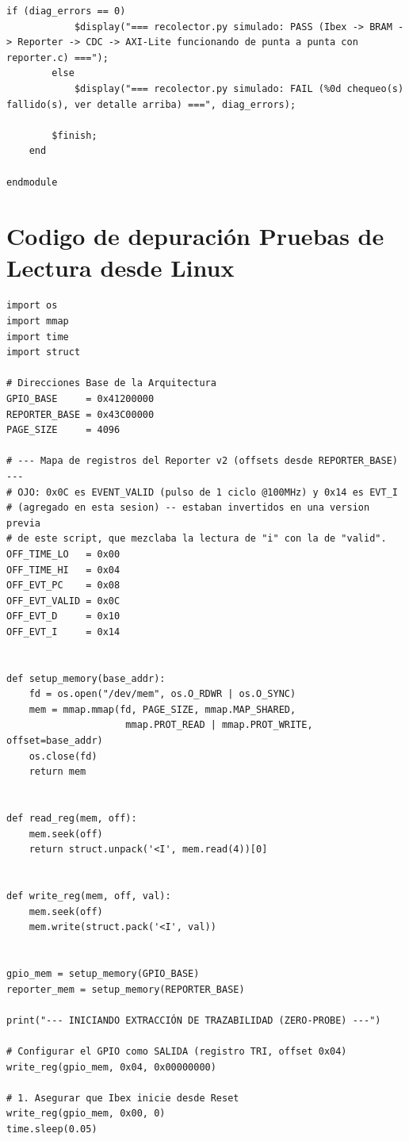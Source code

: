 \begin{lstlisting}[style=verilogstyle, basicstyle=\ttfamily\footnotesize, caption={Código fuente del subsistema \texttt{tb\_ibex\_bram\_subsystem.sv}}, label={code:tb_ibex_bram_subsystem.sv}]
        if (diag_errors == 0)
            $display("=== recolector.py simulado: PASS (Ibex -> BRAM -> Reporter -> CDC -> AXI-Lite funcionando de punta a punta con reporter.c) ===");
        else
            $display("=== recolector.py simulado: FAIL (%0d chequeo(s) fallido(s), ver detalle arriba) ===", diag_errors);

        $finish;
    end

endmodule
\end{lstlisting}


\section{Codigo de depuración Pruebas de Lectura desde Linux}

\begin{lstlisting}[style=pythonstyle, basicstyle=\ttfamily\footnotesize, caption={Código recolector.py}, label={code:recolector.py}]
import os
import mmap
import time
import struct

# Direcciones Base de la Arquitectura
GPIO_BASE     = 0x41200000
REPORTER_BASE = 0x43C00000
PAGE_SIZE     = 4096

# --- Mapa de registros del Reporter v2 (offsets desde REPORTER_BASE) ---
# OJO: 0x0C es EVENT_VALID (pulso de 1 ciclo @100MHz) y 0x14 es EVT_I
# (agregado en esta sesion) -- estaban invertidos en una version previa
# de este script, que mezclaba la lectura de "i" con la de "valid".
OFF_TIME_LO   = 0x00
OFF_TIME_HI   = 0x04
OFF_EVT_PC    = 0x08
OFF_EVT_VALID = 0x0C
OFF_EVT_D     = 0x10
OFF_EVT_I     = 0x14


def setup_memory(base_addr):
    fd = os.open("/dev/mem", os.O_RDWR | os.O_SYNC)
    mem = mmap.mmap(fd, PAGE_SIZE, mmap.MAP_SHARED,
                     mmap.PROT_READ | mmap.PROT_WRITE, offset=base_addr)
    os.close(fd)
    return mem


def read_reg(mem, off):
    mem.seek(off)
    return struct.unpack('<I', mem.read(4))[0]


def write_reg(mem, off, val):
    mem.seek(off)
    mem.write(struct.pack('<I', val))


gpio_mem = setup_memory(GPIO_BASE)
reporter_mem = setup_memory(REPORTER_BASE)

print("--- INICIANDO EXTRACCIÓN DE TRAZABILIDAD (ZERO-PROBE) ---")

# Configurar el GPIO como SALIDA (registro TRI, offset 0x04)
write_reg(gpio_mem, 0x04, 0x00000000)

# 1. Asegurar que Ibex inicie desde Reset
write_reg(gpio_mem, 0x00, 0)
time.sleep(0.05)


\end{lstlisting}
